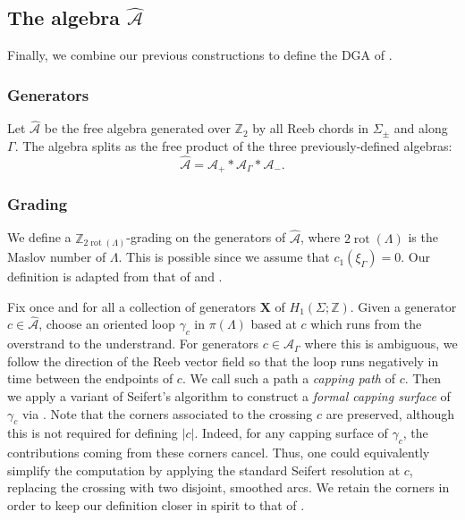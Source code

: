 \documentclass[11pt]{amsart}
\theoremstyle{mystyle}
\newcommand{\Z}{\mathbb{Z}}
\newcommand{\<}{\langle}
\renewcommand{\>}{\rangle}
\DeclareMathOperator{\rot}{\text{rot}}
\begin{document}
 
\subsection{The algebra $\widehat{\mathcal{A}}$}\label{subsec:Ahat} \text{ }

Finally, we combine our previous constructions to define the DGA of .
\subsubsection{Generators} Let $\widehat{\mathcal{A}}$ be the free algebra generated over $\Z_2$ by all Reeb chords in $\Sigma_\pm$ and along $\Gamma$. The algebra splits as the free product of the three previously-defined algebras: \[\widehat{\mathcal{A}} = \mathcal{A}_+* \mathcal{A}_\Gamma* \mathcal{A}_-.\] %

\subsubsection{Grading}\label{sec: grading}
We define a $\Z_{2\rot(\Lambda)}$-grading on the generators of $\widehat{\mathcal{A}}$, where $2\rot(\Lambda)$ is the Maslov number of $\Lambda$. This is possible since we assume that $c_1(\xi_\Gamma) = 0$. Our definition is adapted from that of \cite{sabloff2003circle} and \cite{licata2013seifert} .

Fix once and for all a collection of generators $\textbf{X}$ of $H_1(\Sigma; \Z)$. Given a generator $c\in \widehat{\mathcal{A}}$, choose an oriented loop $\gamma_c$ in $\pi(\Lambda)$ based at $c$ which runs from the overstrand to the understrand. For generators $c\in \mathcal{A}_\Gamma$ where this is ambiguous, we follow the direction of the Reeb vector field so that the loop runs negatively in time between the endpoints of $c$. We call such a path a \textit{capping path} of $c$. Then we apply a variant of Seifert's algorithm to construct a \textit{formal capping surface} of $\gamma_c$ via . Note that the corners associated to the crossing $c$ are preserved, although this is not required for defining $|c|$. Indeed, for any capping surface of $\gamma_c$, the contributions coming from these corners cancel. Thus, one could equivalently simplify the computation by applying the standard Seifert resolution at $c$, replacing the crossing with two disjoint, smoothed arcs. We retain the corners in order to keep our definition closer in spirit to that of \cite{licata2013seifert}.
\end{document}
